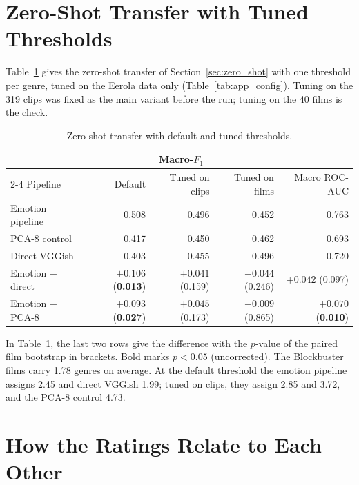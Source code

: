\section{Zero-Shot Transfer with Tuned Thresholds}
\label{sec:app_zs_threshold}

Table~\ref{tab:app_zs_threshold} gives the zero-shot transfer of Section~\ref{sec:zero_shot}
with one threshold per genre, tuned on the Eerola data only (Table~\ref{tab:app_config}).
Tuning on the 319 clips was fixed as the main variant before the run; tuning on the 40 films
is the check.

\begin{table}[H]
  \centering
  \small
  \caption{Zero-shot transfer with default and tuned thresholds.}
  \label{tab:app_zs_threshold}
  \begin{tabular}{lrrrr}
    \toprule
    & \multicolumn{3}{c}{Macro-$F_1$} & \\
    \cmidrule(lr){2-4}
    Pipeline & Default & Tuned on clips & Tuned on films & Macro ROC-AUC \\
    \midrule
    Emotion pipeline & 0.508 & 0.496 & 0.452 & 0.763 \\
    PCA-8 control    & 0.417 & 0.450 & 0.462 & 0.693 \\
    Direct VGGish    & 0.403 & 0.455 & 0.496 & 0.720 \\
    \midrule
    Emotion $-$ direct & $+0.106$ (\textbf{0.013}) & $+0.041$ (0.159) & $-0.044$ (0.246) & $+0.042$ (0.097) \\
    Emotion $-$ PCA-8  & $+0.093$ (\textbf{0.027}) & $+0.045$ (0.173) & $-0.009$ (0.865) & $+0.070$ (\textbf{0.010}) \\
    \bottomrule
  \end{tabular}
\end{table}

In Table~\ref{tab:app_zs_threshold}, the last two rows give the difference with the $p$-value
of the paired film bootstrap in brackets. Bold marks $p<0.05$ (uncorrected). The Blockbuster films carry
1.78 genres on average. At the default threshold the emotion pipeline assigns 2.45 and direct
VGGish 1.99; tuned on clips, they assign 2.85 and 3.72, and the PCA-8 control 4.73.

\clearpage
\section{How the Ratings Relate to Each Other}
\label{sec:app_ratings}


